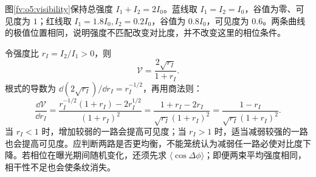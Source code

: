 图\ref{fv:o5:visibility}保持总强度 $I_1+I_2=2I_0$。蓝线取 $I_1=I_2=I_0$，谷值为零、可见度为 $1$；红线取 $I_1=1.8I_0,I_2=0.2I_0$，谷值为 $0.8I_0$，可见度为 $0.6$。两条曲线的极值位置相同，说明强度不匹配改变对比度，并不改变这里的相位条件。

令强度比 $r_I=I_2/I_1>0$，则
\[
 \mathcal V=\frac{2\sqrt{r_I}}{1+r_I}.
\]
根式的导数为 $\dd(2\sqrt{r_I})/\dd r_I=r_I^{-1/2}$，再用商法则：
\[
\frac{\dd\mathcal V}{\dd r_I}
=\frac{r_I^{-1/2}(1+r_I)-2r_I^{1/2}}{(1+r_I)^2}
=\frac{1+r_I-2r_I}{\sqrt{r_I}(1+r_I)^2}
=\frac{1-r_I}{\sqrt{r_I}(1+r_I)^2}.
\]
当 $r_I<1$ 时，增加较弱的一路会提高可见度；当 $r_I>1$ 时，适当减弱较强的一路也会提高可见度。应判断两路是否更均衡，不能笼统认为减弱任一路必使对比度下降。若相位在曝光期间随机变化，还须先求 $\langle\cos\Delta\phi\rangle$；即便两束平均强度相同，相干性不足也会使条纹消失。
